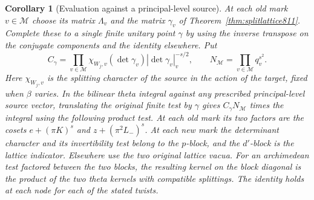 \documentclass[a4paper,11pt]{article}
\newtheorem{corollary}[proposition]{Corollary}
\theoremstyle{definition}
\theoremstyle{remark}
\numberwithin{equation}{section}
\begin{document}
\begin{corollary}[Evaluation against a principal-level source]
\leavevmode\label{cor:gluedperiod811}
At each old mark \(v\in\mathcal M\) choose its matrix \(\Lambda_v\)
and the matrix \(\gamma_v\) of Theorem~\ref{thm:splitlattice811}.
Complete these to a single finite unitary point \(\gamma\) by
using the inverse transpose on the conjugate components and
the identity elsewhere. Put
\[
       C_\gamma=\prod_{v\in\mathcal M}
         \chi_{W_j,v}(\det\gamma_v)
                    |\det\gamma_v|_v^{-s/2},\qquad
       N_{\mathcal M}=\prod_{v\in\mathcal M}q_v^{s^2}.
\]
Here \(\chi_{W_j,v}\) is the splitting character of the source
in the action of the target, fixed when \(\beta\) varies. In
the bilinear theta integral against any prescribed
principal-level source vector, translating the original
finite test by \(\gamma\) gives \(C_\gamma N_{\mathcal M}\)
times the integral using the following product test.
At each old mark its two factors are the cosets \(e+(\pi K)^s\)
and \(z+(\pi^2L_-)^s\). At each new mark the determinant
character and its invertibility test belong to the \(p\)-block,
and the \(d'\)-block is the lattice indicator. Elsewhere use
the two original lattice vacua. For an archimedean test
factored between the two blocks, the resulting kernel on the
block diagonal is the product of the two theta kernels with
compatible splittings. The identity holds at each node for
each of the stated twists.
\end{corollary}
\end{document}
